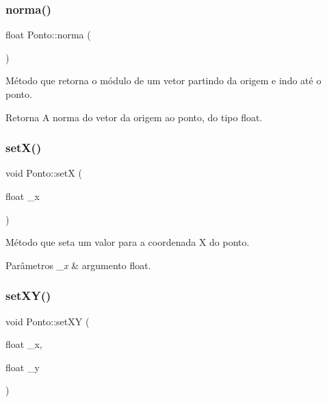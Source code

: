 \subsubsection{\texorpdfstring{norma()}{norma()}}
{\footnotesize\ttfamily float Ponto\+::norma (\begin{DoxyParamCaption}{ }\end{DoxyParamCaption})\hspace{0.3cm}{\ttfamily [inline]}}



Método que retorna o módulo de um vetor partindo da origem e indo até o ponto. 

\begin{DoxyReturn}{Retorna}
A norma do vetor da origem ao ponto, do tipo float. 
\end{DoxyReturn}
\mbox{\label{classPonto_a22129ad4dbf8019c479021d70a9f6774}} 
\subsubsection{\texorpdfstring{set\+X()}{setX()}}
{\footnotesize\ttfamily void Ponto\+::setX (\begin{DoxyParamCaption}\item[{float}]{\+\_\+x }\end{DoxyParamCaption})\hspace{0.3cm}{\ttfamily [inline]}}



Método que seta um valor para a coordenada X do ponto. 


\begin{DoxyParams}{Parâmetros}
{\em \+\_\+x} & argumento float. \\
\hline
\end{DoxyParams}
\mbox{\label{classPonto_a827488219a7da184d440f687cec49ce6}} 
\subsubsection{\texorpdfstring{set\+X\+Y()}{setXY()}}
{\footnotesize\ttfamily void Ponto\+::set\+XY (\begin{DoxyParamCaption}\item[{float}]{\+\_\+x,  }\item[{float}]{\+\_\+y }\end{DoxyParamCaption})\hspace{0.3cm}{\ttfamily [inline]}}



